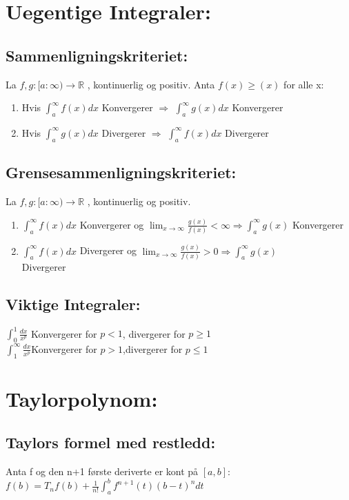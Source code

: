 \documentclass[8pt,a4paper,twocolumn,twoside]{article}
\def\real{\mathbb{R}}
\begin{document}
    \section*{Uegentige Integraler:}
        \subsection*{Sammenligningskriteriet:}
        La $f,g : [a:\infty)\rightarrow \real$ , kontinuerlig og positiv. Anta
        $f(x)\geq(x)$ for alle x:
        \begin{enumerate}[topsep = 0pt,partopsep = 0pt, itemsep = 0cm]
            \item Hvis $\int_a^\infty f(x) dx$ Konvergerer $\Rightarrow$ $\int_a^\infty g(x) dx$ Konvergerer
            \item Hvis $\int_a^\infty g(x) dx$ Divergerer $\Rightarrow$ $\int_a^\infty f(x) dx$ Divergerer
        \end{enumerate}
        \subsection*{Grensesammenligningskriteriet:}
        La $f,g : [a:\infty)\rightarrow \mathbb{R}$ , kontinuerlig og positiv.
        \begin{enumerate}[topsep = 0pt,partopsep = 0pt, itemsep = 0cm]
            \item $\int_a^\infty f(x)dx$ Konvergerer og $\lim_{x\to\infty}\frac{g(x)}{f(x)}<\infty \Rightarrow \int_a^\infty g(x)$ Konvergerer 
            \item $\int_a^\infty f(x)dx$ Divergerer og $\lim_{x\to\infty}\frac{g(x)}{f(x)}>0 \Rightarrow \int_a^\infty g(x)$ \\Divergerer
        \end{enumerate}
        \subsection*{Viktige Integraler:}
        $\int_0^1 \frac{dx}{x^p}$ Konvergerer for $p<1$, divergerer for $p\geq1$\\
        $\int_1^\infty\frac{dx}{x^p}$Konvergerer for $p>1$,divergerer for $p\leq1$\\
    
    \section*{Taylorpolynom:}
        \subsection*{Taylors formel med restledd:}
        Anta f og den n+1 første deriverte er kont på $[a,b]$:\\
        $f(b) = T_n f(b)+\frac{1}{n!}\int_a^b f^{n+1}(t)(b-t)^n dt$
\end{document}
